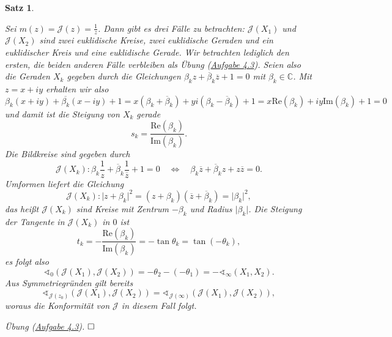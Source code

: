 \documentclass[11pt]{book}
\numberwithin{dummy}{section}
\newtheorem{theorem}{Satz}[section]
\theoremstyle{nonumberbreak}
\newenvironment{pr}[1][]{\ifthenelse{\equal{#1}{}}{\proof}{\proof[#1]}\rm}{\endproof}
\newcommand{\C}{\mathbb{C}}
\begin{document}
\begin{spacing}{1.4}
\begin{theorem}
\begin{pr}
\begin{compactenum}
\item Sei $m(z) = \mathcal{J}(z) = \frac{1}{z}$. Dann gibt es drei Fälle zu betrachten: $\mathcal{J}(X_1)$ und $\mathcal{J}(X_2)$ sind zwei euklidische Kreise, zwei euklidische Geraden und ein euklidischer Kreis und eine euklidische Gerade. Wir betrachten lediglich den ersten, die beiden anderen Fälle verbleiben als Übung (\hyperlink{Avierdrei}{Aufgabe 4.3}). Seien also die Geraden $X_k$ gegeben durch die Gleichungen $\beta_k z + \overline{\beta}_k \overline{z} +1 =0$ mit $\beta_k \in \C$. Mit $z=x+iy$ erhalten wir also 
$$\beta_k (x+iy) + \overline{\beta_k}(x-iy) + 1 = x(\beta_k + \overline{\beta}_k) + yi (\beta_k - \overline{\beta}_k) + 1 = x \mathrm{Re}(\beta_k) + iy \mathrm{Im}(\beta_k) + 1 = 0$$
und damit ist die Steigung von $X_k$ gerade 
$$s_k = \frac{\mathrm{Re}(\beta_k)}{\mathrm{Im}(\beta_k)}.$$
Die Bildkreise sind gegeben durch 
$$\mathcal{J}(X_k): \beta_k \frac{1}{z} + \overline{\beta}_k \frac{1}{\overline{z}} + 1 = 0 \quad \Longleftrightarrow \quad \beta_k \overline{z} + \overline{\beta}_k z + z \overline{z} = 0.$$
Umformen liefert die Gleichung
$$\mathcal{J}(X_k): \vert z + \beta_k \vert ^2 = (z+ \beta_k)(\overline{z} + \overline{\beta}_k) = \vert \beta_k \vert^2,$$
das heißt $\mathcal{J}(X_k)$ sind Kreise mit Zentrum $-\beta_k$ und Radius $\vert \beta_k \vert$. Die Steigung der Tangente in $\mathcal{J}(X_k)$ in $0$ ist
$$t_k = - \frac{\mathrm{Re}(\beta_k)}{\mathrm{Im}(\beta_k)} = - \tan \theta_k = \tan (-\theta_k),$$
es folgt also 
$$\sphericalangle_0 (\mathcal{J}(X_1), \mathcal{J}(X_2)) = - \theta_2 - (-\theta_1) = - \sphericalangle_{\infty} (X_1, X_2).$$
Aus Symmetriegründen gilt bereits 
$$\sphericalangle_{\mathcal{J}(z_0)} (\mathcal{J}(X_1), \mathcal{J}(X_2)) = \sphericalangle_{\mathcal{J}(\infty)} (\mathcal{J}(X_1), \mathcal{J}(X_2)),$$
woraus die Konformität von $\mathcal{J}$ in diesem Fall folgt.
\item Übung (\hyperlink{Avierdrei}{Aufgabe 4.3}). $\hfill \Box$


\end{compactenum}




\end{pr}


\end{theorem}











































\end{spacing}
\end{document}
